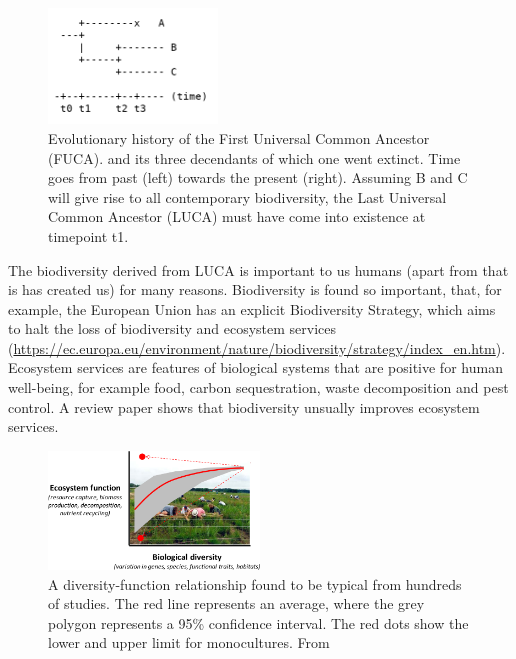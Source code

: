 \begin{figure}[H]
  \includegraphics[width=0.4\textwidth]{t_3.png}
  \caption{
    Evolutionary history of the First Universal Common Ancestor (FUCA).
    and its three decendants of which one went extinct.
    Time goes from past (left) towards the present (right).
    Assuming B and C will give rise to all contemporary biodiversity,
    the Last Universal Common Ancestor (LUCA) must have come into existence
    at timepoint t1.
  }
  \label{fig:t_3}
\end{figure}

The biodiversity derived from LUCA is important to us 
humans (apart from that is has created us) for many reasons.
Biodiversity is found so important, that, for example, 
the European Union has an explicit Biodiversity Strategy,
which aims to halt the loss of biodiversity and ecosystem 
services (\url{https://ec.europa.eu/environment/nature/biodiversity/strategy/index_en.htm}).
Ecosystem services are features of biological systems that are 
positive for human well-being, for example food,
carbon sequestration, waste decomposition and pest control.
A review paper \cite{cardinale2012biodiversity} shows that 
biodiversity unsually improves ecosystem services.

\begin{figure}[H]
  \includegraphics[width=0.5\textwidth]{cardinale_et_al_fig_1.png}
  \caption{
    A diversity-function relationship found to be typical from hundreds
    of studies. The red line represents an average, where the grey polygon
    represents a 95\% confidence interval. The red dots show the lower
    and upper limit for monocultures. From \cite{cardinale2012biodiversity}
  }
  \label{fig:cardinale_et_al}
\end{figure}



